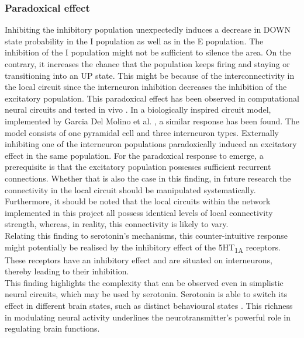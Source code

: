 \subsubsection{Paradoxical effect}

\noindent 
\indent Inhibiting the inhibitory population unexpectedly induces a decrease in DOWN state probability in the I population as well as in the E population. The inhibition of the I population might not be sufficient to silence the area. On the contrary, it increases the chance that the population keeps firing and staying or transitioning into an UP state. This might be because of the interconnectivity in the local circuit since the interneuron inhibition decreases the inhibition of the excitatory population. This paradoxical effect has been observed in computational neural circuits and tested in vivo \cite{tsodyksParadoxicalEffectsExternal1997a}. In a biologically inspired circuit model, implemented by Garcia Del Molino et al. \cite{garciadelmolinoParadoxicalResponseReversal2017}, a similar response has been found. The model consists of one pyramidal cell and three interneuron types. Externally inhibiting one of the interneuron populations paradoxically induced an excitatory effect in the same population. For the paradoxical response to emerge, a prerequisite is that the excitatory population possesses sufficient recurrent connections\cite{garciadelmolinoParadoxicalResponseReversal2017, tsodyksParadoxicalEffectsExternal1997a}. Whether that is also the case in this finding, in future research the connectivity in the local circuit should be manipulated systematically. Furthermore, it should be noted that the local circuits within the network implemented in this project all possess identical levels of local connectivity strength, whereas, in reality, this connectivity is likely to vary.
\\
\indent Relating this finding to serotonin's mechanisms, this counter-intuitive response might potentially be realised by the inhibitory effect of the 5HT\textsubscript{1A} receptors. These receptors have an inhibitory effect and are situated on interneurons, thereby leading to their inhibition.
\\
\indent This finding highlights the complexity that can be observed even in simplistic neural circuits, which may be used by serotonin. Serotonin is able to switch its effect in different brain states, such as distinct behavioural states \cite{clarkeCognitiveInflexibilityPrefrontal}. This richness in modulating neural activity underlines the neurotransmitter's powerful role in regulating brain functions.


